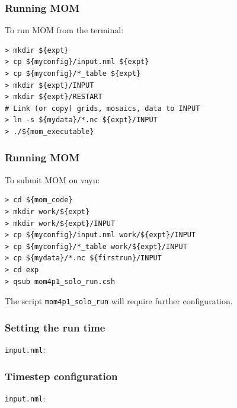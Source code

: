 \documentclass[red]{beamer}
\begin{document}
\begin{frame}[fragile]
    \frametitle{Running MOM}
    
    To run MOM from the terminal:
    \begin{lstlisting}
> mkdir ${expt}
> cp ${myconfig}/input.nml ${expt}
> cp ${myconfig}/*_table ${expt}
> mkdir ${expt}/INPUT
> mkdir ${expt}/RESTART
# Link (or copy) grids, mosaics, data to INPUT
> ln -s ${mydata}/*.nc ${expt}/INPUT
> ./${mom_executable}
    \end{lstlisting}

\end{frame}

\begin{frame}[fragile]
    \frametitle{Running MOM}
    
    To submit MOM on vayu:
    \begin{lstlisting}
> cd ${mom_code}
> mkdir work/${expt}
> mkdir work/${expt}/INPUT
> cp ${myconfig}/input.nml work/${expt}/INPUT
> cp ${myconfig}/*_table work/${expt}/INPUT
> cp ${mydata}/*.nc ${firstrun}/INPUT
> cd exp
> qsub mom4p1_solo_run.csh
    \end{lstlisting}
The script \lstinline|mom4p1_solo_run| will require further configuration.

\end{frame}

\begin{frame}[fragile]
    \frametitle{Setting the run time}
   
    \lstinline|input.nml|:
    
\end{frame}

\begin{frame}[fragile]
    \frametitle{Timestep configuration}
   
    \lstinline|input.nml|:
    
\end{frame}
\end{document}
